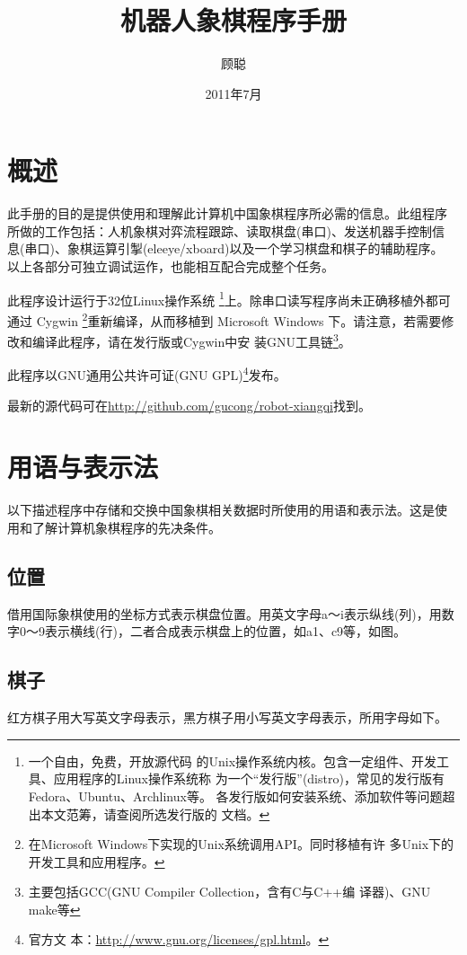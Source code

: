 \documentclass[a4paper]{article}
\title{机器人象棋程序手册}
\author{顾聪}
\date{2011年7月}
\begin{document}
\maketitle
\tableofcontents


\section{概述}
此手册的目的是提供使用和理解此计算机中国象棋程序所必需的信息。此组程序
所做的工作包括：人机象棋对弈流程跟踪、读取棋盘(串口)、发送机器手控制信
息(串口)、象棋运算引掣(eleeye/xboard)以及一个学习棋盘和棋子的辅助程序。
以上各部分可独立调试运作，也能相互配合完成整个任务。

此程序设计运行于32位Linux操作系统 \footnote{一个自由，免费，开放源代码
  的Unix操作系统内核。包含一定组件、开发工具、应用程序的Linux操作系统称
  为一个``发行版''(distro)，常见的发行版有Fedora、Ubuntu、Archlinux等。
  各发行版如何安装系统、添加软件等问题超出本文范筹，请查阅所选发行版的
  文档。}上。除串口读写程序尚未正确移植外都可通过 Cygwin
\footnote{在Microsoft Windows下实现的Unix系统调用API。同时移植有许
  多Unix下的开发工具和应用程序。}重新编译，从而移植到 Microsoft
Windows 下。请注意，若需要修改和编译此程序，请在发行版或Cygwin中安
装GNU工具链\footnote{主要包括GCC(GNU Compiler Collection，含有C与C++编
  译器)、GNU make等}。

此程序以GNU通用公共许可证(GNU GPL)\footnote{官方文
  本：\url{http://www.gnu.org/licenses/gpl.html}。}发布。

最新的源代码可在\url{http://github.com/gucong/robot-xiangqi}找到。

\section{用语与表示法}
以下描述程序中存储和交换中国象棋相关数据时所使用的用语和表示法。这是使
用和了解计算机象棋程序的先决条件。

\subsection{位置}
借用国际象棋使用的坐标方式表示棋盘位置。用英文字母a～i表示纵线(列)，用数
字0～9表示横线(行)，二者合成表示棋盘上的位置，如a1、c9等，如图。

\smallboard
\begin{position}
\end{position}

\subsection{棋子}
红方棋子用大写英文字母表示，黑方棋子用小写英文字母表示，所用字母如下。
\end{document}
